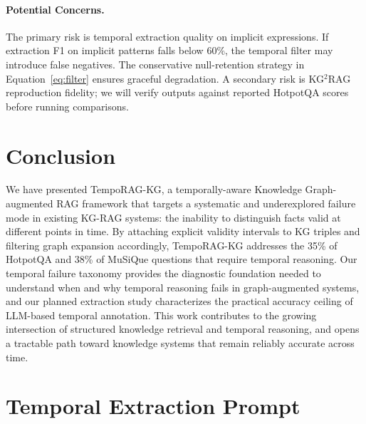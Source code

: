 \documentclass[11pt]{article}
\begin{document}
\paragraph{Potential Concerns.}
The primary risk is temporal extraction quality on implicit expressions.
If extraction F1 on implicit patterns falls below 60\%, the temporal
filter may introduce false negatives. The conservative null-retention
strategy in Equation~\ref{eq:filter} ensures graceful degradation.
A secondary risk is KG$^2$RAG reproduction fidelity; we will verify
outputs against reported HotpotQA scores before running comparisons.

\section{Conclusion}

We have presented TempoRAG-KG, a temporally-aware Knowledge Graph-augmented
RAG framework that targets a systematic and underexplored failure mode in
existing KG-RAG systems: the inability to distinguish facts valid at
different points in time. By attaching explicit validity intervals to KG
triples and filtering graph expansion accordingly, TempoRAG-KG addresses
the 35\% of HotpotQA and 38\% of MuSiQue questions that require temporal
reasoning. Our temporal failure taxonomy provides the diagnostic foundation
needed to understand when and why temporal reasoning fails in
graph-augmented systems, and our planned extraction study characterizes
the practical accuracy ceiling of LLM-based temporal annotation. This
work contributes to the growing intersection of structured knowledge
retrieval and temporal reasoning, and opens a tractable path toward
knowledge systems that remain reliably accurate across time.




\appendix

\section{Temporal Extraction Prompt}
\label{app:prompt}
\end{document}
